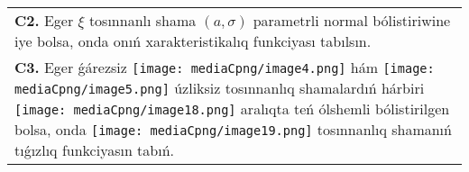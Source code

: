 \documentclass{article}
\begin{document}
\begin{tabular}{m{17cm}}
 \\
\textbf{C2.} Eger \(\xi\) tosınnanlı shama \((a,\sigma)\) parametrli normal bólistiriwine iye bolsa, onda onıń xarakteristikalıq funkciyası tabılsın.
 \\
\textbf{C3.} Eger ǵárezsiz \texttt{[image: mediaCpng/image4.png]} hám \texttt{[image: mediaCpng/image5.png]} úzliksiz tosınnanlıq shamalardıń hárbiri \texttt{[image: mediaCpng/image18.png]} aralıqta teń ólshemli bólistirilgen bolsa, onda \texttt{[image: mediaCpng/image19.png]} tosınnanlıq shamanıń tıǵızlıq funkciyasın tabıń.
 \\

\end{tabular}
\vspace{1cm}
\end{document}
